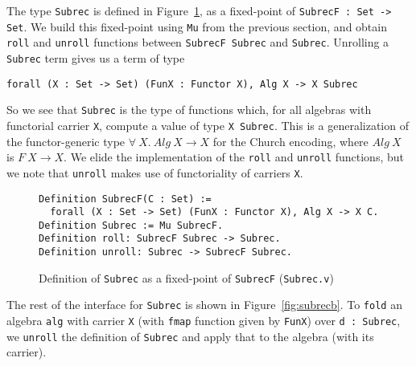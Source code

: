 \documentclass[a4paper,USenglish]{lipics-v2021}
\begin{document}
The type \verb|Subrec| is defined in Figure~\ref{fig:subrec}, as a
fixed-point of \verb|SubrecF : Set -> Set|.  We build this fixed-point
using \verb|Mu| from the previous section, and obtain \verb|roll|
and \verb|unroll| functions between \verb|SubrecF Subrec| and \verb|Subrec|.
Unrolling a \verb|Subrec| term gives us a term of type
\begin{verbatim}
forall (X : Set -> Set) (FunX : Functor X), Alg X -> X Subrec
\end{verbatim}
\noindent So we see that \verb|Subrec| is the type of functions which,
for all algebras with functorial carrier
\verb|X|, compute a value of type \verb|X Subrec|.  This is a
generalization of the functor-generic type
$\forall\ X.\ \textit{Alg}\ X \to X$ for the Church encoding, where
$\textit{Alg}\ X$ is $F\ X \to X$.  We elide the implementation of the
\verb|roll| and \verb|unroll| functions, but we note that \verb|unroll|
makes use of functoriality of carriers \verb|X|.

\begin{figure}
\begin{verbatim}
Definition SubrecF(C : Set) := 
  forall (X : Set -> Set) (FunX : Functor X), Alg X -> X C.
Definition Subrec := Mu SubrecF.
Definition roll: SubrecF Subrec -> Subrec.
Definition unroll: Subrec -> SubrecF Subrec.
\end{verbatim}
\caption{Definition of \texttt{Subrec} as a fixed-point of \texttt{SubrecF} (\texttt{Subrec.v})}
\label{fig:subrec}
\end{figure}

The rest of the interface for \verb|Subrec| is shown in
Figure~\ref{fig:subrecb}.  To \verb|fold| an algebra
\verb|alg| with carrier \verb|X| (with \verb|fmap| function given by
\verb|FunX|) over \verb|d : Subrec|, we \verb|unroll| the
definition of \verb|Subrec| and apply that to the algebra (with its
carrier).
\end{document}
